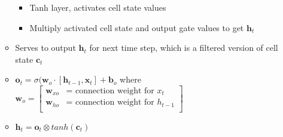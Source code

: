\begin{itemize}
\begin{itemize}
\begin{itemize}
            \item Tanh layer, activates cell state values
            \item Multiply activated cell state and output gate values to get $\boldsymbol{h}_t$
        \end{itemize}
        \item Serves to output $\boldsymbol{h}_t$ for next time step, which is a filtered version of cell state $\boldsymbol{c}_t$
        \item $\boldsymbol{o}_t = \sigma (\boldsymbol{w}_o \cdot [ \boldsymbol{h}_{t-1}, \boldsymbol{x}_t ] + \boldsymbol{b}_o $ where $\boldsymbol{w}_o = \begin{bmatrix}
        \boldsymbol{w}_{xo} & \textrm{= connection weight for } x_t \\
        \boldsymbol{w}_{ho} & \textrm{= connection weight for } h_{t-1} \\
        \end{bmatrix}$
        \item $\boldsymbol{h}_t = \boldsymbol{o}_t \otimes tanh(\boldsymbol{c}_t)$
    \end{itemize}
\end{itemize}
